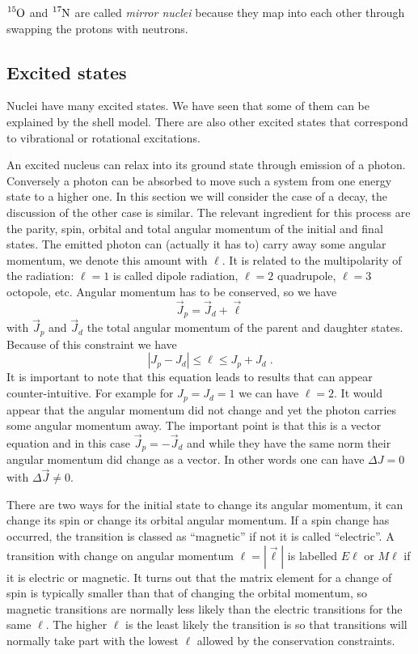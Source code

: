 \documentclass[12pt]{article}
\begin{document}
$\ce{^{15}O}$ and $\ce{^{17}N}$ are called \emph{mirror nuclei} because they map into each other through swapping the protons with neutrons.
%
%
%
\subsection{Excited states}
%
%
%
Nuclei have many excited states. We have seen that some of them can be explained by the shell model. There are also other excited states that correspond to vibrational or rotational excitations. 

An excited nucleus can relax into its ground state through emission of a photon. Conversely a photon can be absorbed to move such a system from one energy state to a higher one. In this section we will consider the case of a decay, the discussion of the other case is similar. The relevant ingredient for this process are the parity, spin, orbital and total angular momentum of the initial and final states. The emitted photon can (actually it has to) carry away some angular momentum, we denote this amount with $\ell$. It is related to the multipolarity of the radiation: $\ell=1$ is called dipole radiation, $\ell=2$ quadrupole, $\ell=3$ octopole, etc. Angular momentum has to be conserved, so we have
\[\vec J_p=\vec J_d+\vec \ell\]
with $\vec J_p$ and $\vec J_d$ the total angular momentum of the parent and daughter states. Because of this constraint we have
\[|J_p-J_d|\leq \ell \leq J_p+J_d \;.\]
It is important to note that this equation leads to results that can appear counter-intuitive. For example for $J_p=J_d=1$ we can have $\ell=2$. It would appear that the angular momentum did not change and yet the photon carries some angular momentum away. The important point is that this is a vector equation and in this case $\vec J_p=-\vec J_d$ and while they have the same norm their angular momentum did change as a vector. In other words one can have $\Delta J=0$ with $\Delta \vec J\neq 0$. 

There are two ways for the initial state to change its angular momentum, it can change its spin or change its orbital angular momentum. If a spin change has occurred, the transition is classed as ``magnetic'' if not it is called ``electric''. A transition with change on angular momentum $\ell=|\vec{\ell}|$ is labelled $E\ell$ or $M\ell$ if it is electric or magnetic. It turns out that the matrix element for a change of spin is typically smaller than that of changing the orbital momentum, so magnetic transitions are normally less likely than the electric transitions for the same $\ell$. The higher $\ell$ is the least likely the transition is so that transitions will normally take part with the lowest $\ell$ allowed by the conservation constraints.
\end{document}
